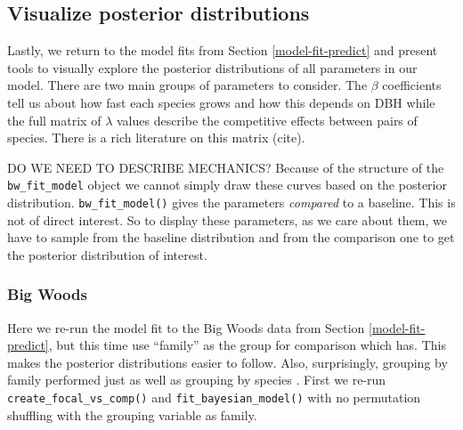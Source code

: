 \documentclass[12pt]{article}
\newenvironment{Shaded}{\begin{snugshade}}{\end{snugshade}}
\newcommand{\DataTypeTok}[1]{\textcolor[rgb]{0.13,0.29,0.53}{#1}}
\newcommand{\KeywordTok}[1]{\textcolor[rgb]{0.13,0.29,0.53}{\textbf{#1}}}
\newcommand{\NormalTok}[1]{#1}
\newcommand{\OperatorTok}[1]{\textcolor[rgb]{0.81,0.36,0.00}{\textbf{#1}}}
\newcommand{\OtherTok}[1]{\textcolor[rgb]{0.56,0.35,0.01}{#1}}
\newcommand{\StringTok}[1]{\textcolor[rgb]{0.31,0.60,0.02}{#1}}
\begin{document}
\hypertarget{viz-posterior-distributions}{%
\subsection{Visualize posterior
distributions}\label{viz-posterior-distributions}}

Lastly, we return to the model fits from Section \ref{model-fit-predict}
and present tools to visually explore the posterior distributions of all
parameters in our model. There are two main groups of parameters to
consider. The \(\beta\) coefficients tell us about how fast each species
grows and how this depends on DBH while the full matrix of \(\lambda\)
values describe the competitive effects between pairs of species. There
is a rich literature on this matrix (cite).

DO WE NEED TO DESCRIBE MECHANICS? Because of the structure of the
\texttt{bw\_fit\_model} object we cannot simply draw these curves based
on the posterior distribution. \texttt{bw\_fit\_model()} gives the
parameters \emph{compared} to a baseline. This is not of direct
interest. So to display these parameters, as we care about them, we have
to sample from the baseline distribution and from the comparison one to
get the posterior distribution of interest.

\hypertarget{big-woods-6}{%
\subsubsection{Big Woods}\label{big-woods-6}}

Here we re-run the model fit to the Big Woods data from Section
\ref{model-fit-predict}, but this time use ``family'' as the group for
comparison which has. This makes the posterior distributions easier to
follow. Also, surprisingly, grouping by family performed just as well as
grouping by species \citet{allen_permutation_2020}. First we re-run
\texttt{create\_focal\_vs\_comp()} and \texttt{fit\_bayesian\_model()}
with no permutation shuffling with the grouping variable as family.

\begin{Shaded}
\end{Shaded}
\end{document}
